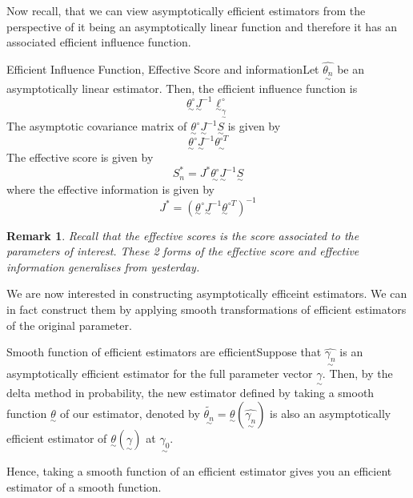 \documentclass[twoside]{article}
\newtheorem{remark}[theorem]{Remark}
\newcommand{\utilde}{\underset{\sim}}
\begin{document}
\newpage
Now recall, that we can view asymptotically efficient estimators from the perspective of it being an asymptotically linear function and therefore it has an associated efficient influence function.

\begin{definition_exam}{Efficient Influence Function, Effective Score and information}{}Let $\hat{\utilde{\theta_n}}$ be an asymptotically linear estimator. Then, the efficient influence function is 
$$
\utilde{\theta^{\circ}}\utilde{J}^{-1}\utilde{\ell}_{\utilde{\gamma}}^{\circ}
$$
The asymptotic covariance matrix of $\utilde{\theta}^{\circ}\utilde{J}^{-1}\utilde{S}$ is given by 
$$
\utilde{\theta}^{\circ}\utilde{J}^{-1}\utilde{\theta^{\circ T}}
$$
The effective score is given by 
$$
S_n^{*} = J^*\utilde{\theta^{\circ}}\utilde{J}^{-1}\utilde{S}
$$
where the effective information is given by 
$$
J^* = (\utilde{\theta}^{\circ}\utilde{J}^{-1}\utilde{\theta}^{\circ T})^{-1}
$$
\end{definition_exam}

\begin{remark}Recall that the effective scores is the score associated to the parameters of interest. These 2 forms of the effective score and effective information generalises from yesterday.
\end{remark}

We are now interested in constructing asymptotically efficeint estimators. We can in fact construct them by applying smooth transformations of efficient estimators of the original parameter.

\begin{proposition_exam}{Smooth function of efficient estimators are efficient}{}Suppose that $\hat{\utilde{\gamma_n}}$ is an asymptotically efficient estimator for the full parameter vector $\utilde{\gamma}.$ Then, by the delta method in probability, the new estimator defined by taking a smooth function $\utilde{\theta}$ of our estimator, denoted by $\tilde{\utilde{\theta_n}} = \utilde{\theta}(\hat{\utilde{\gamma_n}})$ is also an asymptotically efficient estimator of $\utilde{\theta}(\utilde{\gamma})$ at $\utilde{\gamma_0}.$
\end{proposition_exam}

Hence, taking a smooth function of an efficient estimator gives you an efficient estimator of a smooth function.
\end{document}

